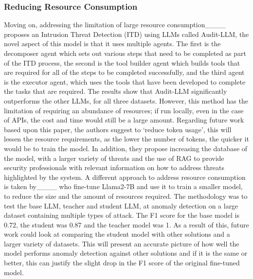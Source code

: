 \subsubsection{Reducing Resource Consumption}
Moving on, addressing the limitation of large resource consumption____ proposes an Intrusion Threat Detection (ITD) using LLMs called Audit-LLM, the novel aspect of this model is that it uses multiple agents. The first is the decomposer agent which sets out various steps that need to be completed as part of the ITD process, the second is the tool builder agent which builds tools that are required for all of the steps to be completed successfully, and the third agent is the executor agent, which uses the tools that have been developed to complete the tasks that are required. The results show that Audit-LLM significantly outperforms the other LLMs, for all three datasets. However, this method has the limitation of requiring an abundance of resources; if run locally, even in the case of APIs, the cost and time would still be a large amount. Regarding future work based upon this paper, the authors suggest to `reduce token usage', this will lessen the resource requirements, as the lower the number of tokens, the quicker it would be to train the model. In addition, they propose increasing the database of the model, with a larger variety of threats and the use of RAG to provide security professionals with relevant information on how to address threats highlighted by the system. A different approach to address resource consumption is taken by____ who fine-tune Llama2-7B and use it to train a smaller model, to reduce the size and the amount of resources required. The methodology was to test the base LLM, teacher and student LLM, at anomaly detection on a large dataset containing multiple types of attack. The F1 score for the base model is 0.72, the student was 0.87 and the teacher model was 1. As a result of this, future work could look at comparing the student model with other solutions and a larger variety of datasets. This will present an accurate picture of how well the model performs anomaly detection against other solutions and if it is the same or better, this can justify the slight drop in the F1 score of the original fine-tuned model. 

